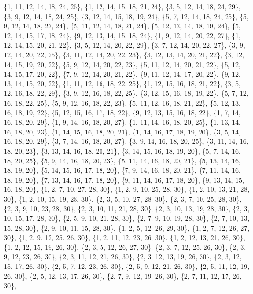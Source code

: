 \documentclass[11pt,a4paper]{article}
\begin{document}
{\{1, 11, 12, 14, 18, 24, 25\}, \{1, 12, 14, 15, 18, 21, 24\}, \{3, 5, 12, 14, 18, 24, 29\}, \{3, 9, 12, 14, 18, 24, 25\}, \{3, 12, 14, 15, 18, 19, 24\},
\{5, 7, 12, 14, 18, 24, 25\}, \{5, 9, 12, 14, 18, 23, 24\}, \{5, 11, 12, 14, 18, 21, 24\}, \{5, 12, 13, 14, 18, 19, 24\}, \{5, 12, 14, 15, 17, 18, 24\},
\{9, 12, 13, 14, 15, 18, 24\}, \{1, 9, 12, 14, 20, 22, 27\}, \{1, 12, 14, 15, 20, 21, 22\}, \{3, 5, 12, 14, 20, 22, 29\}, \{3, 7, 12, 14, 20, 22, 27\},
\{3, 9, 12, 14, 20, 22, 25\}, \{3, 11, 12, 14, 20, 22, 23\}, \{3, 12, 13, 14, 20, 21, 22\}, \{3, 12, 14, 15, 19, 20, 22\}, \{5, 9, 12, 14, 20, 22, 23\},
\{5, 11, 12, 14, 20, 21, 22\}, \{5, 12, 14, 15, 17, 20, 22\}, \{7, 9, 12, 14, 20, 21, 22\}, \{9, 11, 12, 14, 17, 20, 22\}, \{9, 12, 13, 14, 15, 20, 22\},
\{1, 11, 12, 16, 18, 22, 25\}, \{1, 12, 15, 16, 18, 21, 22\}, \{3, 5, 12, 16, 18, 22, 29\}, \{3, 9, 12, 16, 18, 22, 25\}, \{3, 12, 15, 16, 18, 19, 22\},
\{5, 7, 12, 16, 18, 22, 25\}, \{5, 9, 12, 16, 18, 22, 23\}, \{5, 11, 12, 16, 18, 21, 22\}, \{5, 12, 13, 16, 18, 19, 22\}, \{5, 12, 15, 16, 17, 18, 22\},
\{9, 12, 13, 15, 16, 18, 22\}, \{1, 7, 14, 16, 18, 20, 29\}, \{1, 9, 14, 16, 18, 20, 27\}, \{1, 11, 14, 16, 18, 20, 25\}, \{1, 13, 14, 16, 18, 20, 23\},
\{1, 14, 15, 16, 18, 20, 21\}, \{1, 14, 16, 17, 18, 19, 20\}, \{3, 5, 14, 16, 18, 20, 29\}, \{3, 7, 14, 16, 18, 20, 27\}, \{3, 9, 14, 16, 18, 20, 25\},
\{3, 11, 14, 16, 18, 20, 23\}, \{3, 13, 14, 16, 18, 20, 21\}, \{3, 14, 15, 16, 18, 19, 20\}, \{5, 7, 14, 16, 18, 20, 25\}, \{5, 9, 14, 16, 18, 20, 23\},
\{5, 11, 14, 16, 18, 20, 21\}, \{5, 13, 14, 16, 18, 19, 20\}, \{5, 14, 15, 16, 17, 18, 20\}, \{7, 9, 14, 16, 18, 20, 21\}, \{7, 11, 14, 16, 18, 19, 20\},
\{7, 13, 14, 16, 17, 18, 20\}, \{9, 11, 14, 16, 17, 18, 20\}, \{9, 13, 14, 15, 16, 18, 20\}, \{1, 2, 7, 10, 27, 28, 30\}, \{1, 2, 9, 10, 25, 28, 30\},
\{1, 2, 10, 13, 21, 28, 30\}, \{1, 2, 10, 15, 19, 28, 30\}, \{2, 3, 5, 10, 27, 28, 30\}, \{2, 3, 7, 10, 25, 28, 30\}, \{2, 3, 9, 10, 23, 28, 30\},
\{2, 3, 10, 11, 21, 28, 30\}, \{2, 3, 10, 13, 19, 28, 30\}, \{2, 3, 10, 15, 17, 28, 30\}, \{2, 5, 9, 10, 21, 28, 30\}, \{2, 7, 9, 10, 19, 28, 30\},
\{2, 7, 10, 13, 15, 28, 30\}, \{2, 9, 10, 11, 15, 28, 30\}, \{1, 2, 5, 12, 26, 29, 30\}, \{1, 2, 7, 12, 26, 27, 30\}, \{1, 2, 9, 12, 25, 26, 30\},
\{1, 2, 11, 12, 23, 26, 30\}, \{1, 2, 12, 13, 21, 26, 30\}, \{1, 2, 12, 15, 19, 26, 30\}, \{2, 3, 5, 12, 26, 27, 30\}, \{2, 3, 7, 12, 25, 26, 30\},
\{2, 3, 9, 12, 23, 26, 30\}, \{2, 3, 11, 12, 21, 26, 30\}, \{2, 3, 12, 13, 19, 26, 30\}, \{2, 3, 12, 15, 17, 26, 30\}, \{2, 5, 7, 12, 23, 26, 30\},
\{2, 5, 9, 12, 21, 26, 30\}, \{2, 5, 11, 12, 19, 26, 30\}, \{2, 5, 12, 13, 17, 26, 30\}, \{2, 7, 9, 12, 19, 26, 30\}, \{2, 7, 11, 12, 17, 26, 30\},
}
\end{document}
